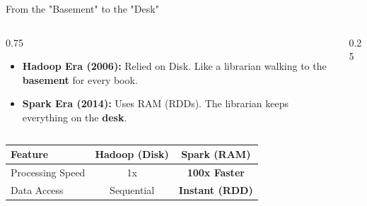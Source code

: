 \begin{frame}{From the "Basement" to the "Desk"}
    \begin{columns}
        \begin{column}{0.75\textwidth}
            \begin{itemize}
                \item \textbf{Hadoop Era (2006):} Relied on Disk. Like a librarian walking to the \textbf{basement} for every book.
                \item \textbf{Spark Era (2014):} Uses RAM (RDDs). The librarian keeps everything on the \textbf{desk}.
            \end{itemize}
        \end{column}
        \begin{column}{0.25\textwidth}
            \centering
        \end{column}
    \end{columns}

    \vfill
    \begin{table}
        \centering
        \footnotesize
        \begin{tabular}{|l|c|c|}
            \hline
            \textbf{Feature} & \textbf{Hadoop (Disk)} & \textbf{Spark (RAM)} \\ \hline
            Processing Speed & 1x & \textbf{100x Faster} \\ \hline
            Data Access & Sequential & \textbf{Instant (RDD)} \\ \hline
        \end{tabular}
    \end{table}
\end{frame}

